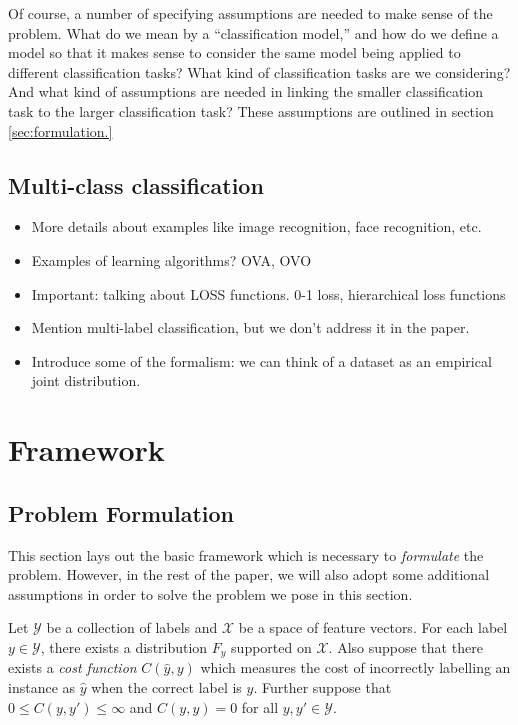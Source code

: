\documentclass[12pt]{article}
\begin{document}
Of course, a number of specifying assumptions are needed to make sense
of the problem.  What do we mean by a ``classification model,'' and
how do we define a model so that it makes sense to consider the same
model being applied to different classification tasks?  What kind of
classification tasks are we considering?  And what kind of assumptions
are needed in linking the smaller classification task to the larger
classification task?  These assumptions are outlined in section \ref{sec:formulation.}

\subsection{Multi-class classification}

\begin{itemize}
\item More details about examples like image recognition, face recognition, etc.
\item Examples of learning algorithms? OVA, OVO
\item Important: talking about LOSS functions.  0-1 loss, hierarchical loss functions
\item Mention multi-label classification, but we don't address it in
  the paper.
\item Introduce some of the formalism: we can think of a dataset as an empirical joint distribution.
\end{itemize}

\section{Framework}\label{sec:formulation}

\subsection{Problem Formulation}

This section lays out the basic framework which is necessary to
\emph{formulate} the problem.  However, in the rest of the paper, we
will also adopt some additional assumptions in order to solve the
problem we pose in this section.

Let $\mathcal{Y}$ be a collection of labels and $\mathcal{X}$ be a
space of feature vectors.  For each label $y \in \mathcal{Y}$, there
exists a distribution $F_y$ supported on $\mathcal{X}$.  Also suppose
that there exists a \emph{cost function} $C(\hat{y}, y)$ which
measures the cost of incorrectly labelling an instance as $\hat{y}$
when the correct label is $y$.  Further suppose that $0 \leq C(y, y')
\leq \infty$ and $C(y, y)=0$ for all $y, y' \in \mathcal{Y}$.
\end{document}
